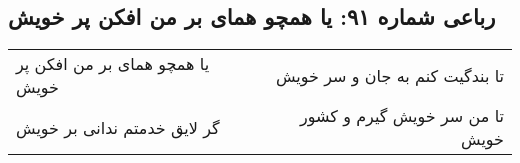\begin{center}
\section*{رباعی شماره ۹۱: یا همچو همای بر من افکن پر خویش}
\label{sec:091}
\begin{longtable}{l p{0.5cm} r}
یا همچو همای بر من افکن پر خویش
&&
تا بندگیت کنم به جان و سر خویش
\\
گر لایق خدمتم ندانی بر خویش
&&
تا من سر خویش گیرم و کشور خویش
\\
\end{longtable}
\end{center}
